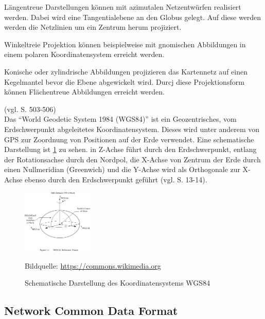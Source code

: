 Längentreue Darstellungen können mit azimutalen Netzentwürfen realisiert werden. Dabei wird eine Tangentialebene an den Globus gelegt. Auf diese werden werden die Netzlinien um ein Zentrum herum projiziert.

Winkeltreie Projektion können beispielweise mit gnomischen Abbildungen in einem polaren Koordinatensystem erreicht werden. 

Konische  oder zylindrische Abbildungen projizieren das Kartennetz auf einen Kegelmantel bevor die Ebene abgewickelt wird. Durcj diese Projektionsform können Flächentreue Abbildungen erreicht werden.


(vgl. \cite{witte2011vermessungskunde} S. 503-506)
\\
Das "`World Geodetic System 1984 (WGS84)"' ist ein Geozentrisches, vom Erdschwerpunkt abgeleitetes Koordinatensystem. Dieses wird unter anderem von GPS zur Zoordnung von Positionen auf der Erde verwendet. Eine schematische Darstellung ist \ref{fig:wgs84} zu sehen. in  Z-Achse führt durch den Erdschwerpunkt, entlang der Rotationsachse durch den Nordpol, die X-Achse von Zentrum der Erde durch einen Nullmeridian (Greenwich) und die Y-Achse wird als Orthogonale zur X-Achse ebenso durch den Erdschwerpunkt geführt (vgl. \cite{witte2011vermessungskunde} S. 13-14).






\begin{figure}[h!]
 \centering
 \includegraphics[width=0.3\textwidth, trim={0 9cm 0 3cm},clip]{pix/WGS_84_reference_frame.png}
 \caption[Schematische Darstellung des Koordinatensystems WGS84]
 {Schematische Darstellung des Koordinatensystems WGS84}
 \footnotesize{
    Bildquelle: \href{https://commons.wikimedia.org/wiki/File:WGS_84_reference_frame_(vector_graphic).svg}
                {\url{https://commons.wikimedia.org}}
 }
 \label{fig:wgs84}
\end{figure}



    

    \subsection{Network Common Data Format}
    
